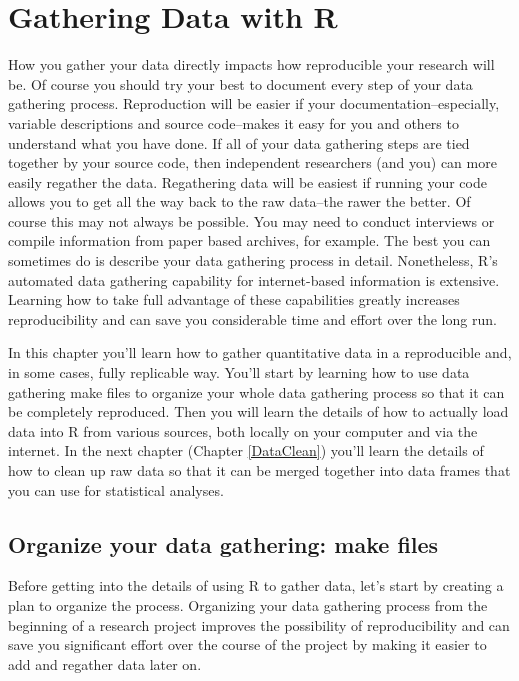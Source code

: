 



\chapter{Gathering Data with R}\label{DataGather}

How you gather your data directly impacts how reproducible your research will be. Of course you should try your best to document every step of your data gathering process. Reproduction will be easier if your documentation--especially, variable descriptions and source code--makes it easy for you and others to understand what you have done. If all of your data gathering steps are tied together by your source code, then independent researchers (and you) can more easily regather the data. Regathering data will be easiest if running your code allows you to get all the way back to the raw data--the rawer the better. Of course this may not always be possible. You may need to conduct interviews or compile information from paper based archives, for example. The best you can sometimes do is describe your data gathering process in detail. Nonetheless, R's automated data gathering capability for internet-based information is extensive. Learning how to take full advantage of these capabilities greatly increases reproducibility and can save you considerable time and effort over the long run.

In this chapter you'll learn how to gather quantitative data in a reproducible and, in some cases, fully replicable way. You'll start by learning how to use data gathering make files to organize your whole data gathering process so that it can be completely reproduced. Then you will learn the details of how to actually load data into R from various sources, both locally on your computer and via the internet. In the next chapter (Chapter \ref{DataClean}) you'll learn the details of how to clean up raw data so that it can be merged together into data frames that you can use for statistical analyses.

\section{Organize your data gathering: make files}

Before getting into the details of using R to gather data, let's start by creating a plan to organize the process. Organizing your data gathering process from the beginning of a research project improves the possibility of reproducibility and can save you significant effort over the course of the project by making it easier to add and regather data later on. 

